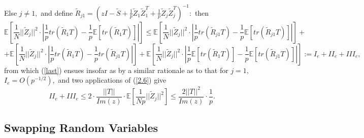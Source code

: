 \documentclass{article}
\numberwithin{equation}{section}
\begin{document}
\par
Else \(j \ne 1,\) and define \(\tilde{R}_{j1}=(zI-\tilde{S}+\frac{1}{p}\tilde{Z}_1\tilde{Z}_1^T+\frac{1}{p}\tilde{Z}_j\tilde{Z}_j^T)^{-1}:\) then
\[\mathbb{E}[\frac{1}{N}||\tilde{Z}_j||^2 \cdot |\frac{1}{p}tr(\tilde{R}_1T)-\frac{1}{p}\mathbb{E}[tr(\tilde{R}_1T)]|] \leq \mathbb{E}[\frac{1}{N}||\tilde{Z}_j||^2 \cdot |\frac{1}{p}tr(\tilde{R}_{j1}T)-\frac{1}{p}\mathbb{E}[tr(\tilde{R}_{j1}T)]|]+\]
\[+\mathbb{E}[\frac{1}{N}||\tilde{Z}_j||^2 \cdot |\frac{1}{p}tr(\tilde{R}_{1}T)-\frac{1}{p}tr(\tilde{R}_{j1}T)|]+\mathbb{E}[\frac{1}{N}||\tilde{Z}_j||^2 \cdot |\frac{1}{p}\mathbb{E}[tr(\tilde{R}_{1}T)]-\frac{1}{p}\mathbb{E}[tr(\tilde{R}_{j1}T)]|]:=I_e+II_e+III_e,\]
from which (\ref{last}) ensues insofar as by a similar rationale as to that for \(j=1,\) \(I_e=O(p^{-1/2}),\) and two applications of (\ref{2.6}) give
\[II_e+III_e \leq 2 \cdot \frac{||T||}{Im(z)} \cdot \mathbb{E}[\frac{1}{Np}||\tilde{Z}_j||^2] \leq  \frac{2||T||^2}{Im(z)} \cdot \frac{1}{p}.\]


\subsection{Swapping Random Variables}\label{4.2}
\end{document}
